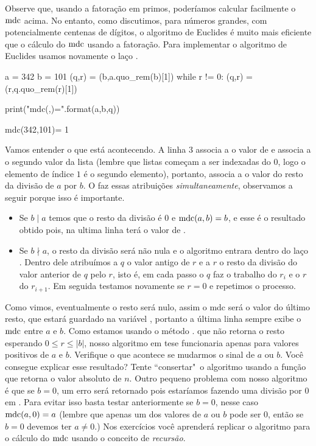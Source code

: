 Observe que, usando a fatoração em primos, poderíamos calcular
facilmente o $\operatorname{mdc}$ acima. No entanto, como discutimos,
para números grandes,
com potencialmente centenas de dígitos, o algoritmo de Euclides
é muito mais eficiente que o cálculo do $\operatorname{mdc}$ usando a fatoração.
Para implementar o algoritmo de Euclides usamos novamente
o laço .

\begin{sageinput}
a = 342
b = 101
(q,r) = (b,a.quo_rem(b)[1])
while r != 0:
  (q,r) = (r,q.quo_rem(r)[1])
  
print("mdc({},{})={}".format(a,b,q))
\end{sageinput}
\begin{sageoutput}
mdc(342,101)= 1
\end{sageoutput}
Vamos entender o que está acontecendo. A linha $3$
associa a  o valor de  e associa a  o segundo
valor da lista  (lembre que listas começam a ser indexadas
do $0$, logo o elemento de índice $1$ é o segundo elemento), portanto, associa
a  o valor do resto da divisão de $a$ por $b$. O \Sage faz essas
atribuições \emph{simultaneamente}, observamos a seguir porque isso é importante.

\begin{itemize}
  \item Se $b\mid a$ temos que o resto da divisão é $0$ e
  $\operatorname{mdc}(a,b) = b$, e esse é o resultado obtido pois, na ultima linha
   terá o valor de .
  \item Se $b \nmid a$, o resto da divisão será não nula e o
  algoritmo entrara dentro do laço . Dentro dele
  atribuímos a $q$ o valor antigo de $r$ e a $r$ o resto
  da divisão do valor anterior de $q$ pelo $r$, isto é,
  em cada passo o $q$ faz o trabalho do $r_i$ e o $r$
  do $r_{i+1}$. Em seguida testamos novamente se $r = 0$ e
  repetimos o processo.
\end{itemize}

Como vimos, eventualmente o resto será nulo, assim 
o mdc será o valor do último
resto, que estará guardado na variável , portanto a última
linha sempre exibe o $\operatorname{mdc}$ entre $a$ e $b$. Como
estamos usando o método . que não retorna o resto
esperando $0\leq r \leq |b|$, nosso algoritmo em tese funcionaria
apenas para valores positivos de $a$ e $b$. Verifique o que acontece
se mudarmos o sinal de $a$ ou $b$. Você consegue explicar esse
resultado? Tente ``consertar"\ o algoritmo usando a função
 que retorna o valor absoluto de $n$. Outro
pequeno problema com nosso algoritmo é que se $b = 0$, um
erro será retornado pois estaríamos fazendo uma divisão 
por $0$ em . Para evitar isso basta testar
anteriormente se $b = 0$, nesse caso $\operatorname{mdc}(a,0) = a$ (lembre que
apenas um dos valores de $a$ ou $b$ pode ser $0$, então se
$b = 0$ devemos ter $a \neq 0$.)
Nos exercícios você aprenderá replicar o algoritmo para o cálculo do
$\operatorname{mdc}$ usando o conceito de \emph{recursão}.

